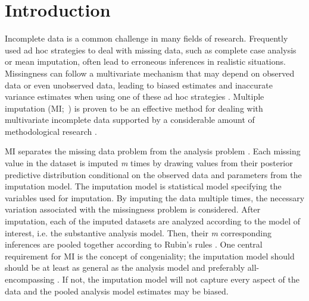 \documentclass[10pt, a4paper, titlepage]{article}
\begin{document}
\newpage
\tableofcontents
\newpage
\section{Introduction}
Incomplete data is a common challenge in many fields of research. Frequently used ad hoc strategies to deal with missing data, such as complete case analysis or mean imputation, often lead to erroneous inferences in realistic situations. Missingness can follow a multivariate mechanism that may depend on observed data or even unobserved data, leading to biased estimates and inaccurate variance estimates when using one of these ad hoc strategies \citep{buurenFlexibleImputationMissing2018, kang2013, enders2017, austin2021, little2002}. Multiple imputation (MI;~) is proven to be an effective method for dealing with multivariate incomplete data supported by a considerable amount of methodological research \citep{mistlerComparisonJointModel2017, buurenFlexibleImputationMissing2018, enders2017, burgette2010, austin2021, audigier2018, vanbuuren2007, grund2021, hughes2014, little2002}.

MI separates the missing data problem from the analysis problem \citep{mistlerComparisonJointModel2017, buurenFlexibleImputationMissing2018, enders2017, burgette2010, austin2021, audigier2018, vanbuuren2007, grund2021, hughes2014, little2002}. Each missing value in the dataset is imputed 
\textit{m} times by drawing values from their posterior predictive distribution conditional on the observed data and parameters from the imputation model. The imputation model is statistical model specifying the variables used for imputation. By imputing the data multiple times, the necessary variation associated with the missingness problem is considered. After imputation, each of the imputed datasets are analyzed according to the model of interest, i.e. the substantive analysis model. Then, their \textit{m} corresponding inferences are pooled together according to Rubin's rules \citep{buurenFlexibleImputationMissing2018, austin2021, rubin1987, carpenter2013}. One central requirement for MI is the concept of congeniality; the imputation model should should be at least as general as the analysis model and preferably all-encompassing \citep{grund2018, enders2018, meng1994multiple, bartlett2015, grund2016, little2002}. If not, the imputation model will not capture every aspect of the data and the pooled analysis model estimates may be biased. 
\end{document}

